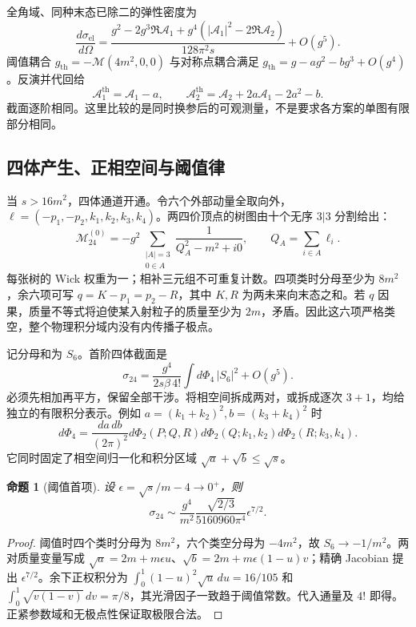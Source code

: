 \documentclass[11pt,a4paper,oneside]{ctexart}
\theoremstyle{cnplain}
\newtheorem{proposition}[theorem]{命题}
\theoremstyle{definition}
\theoremstyle{remark}
\numberwithin{equation}{section}
\begin{document}
全角域、同种末态已除二的弹性密度为
\begin{equation}
 \frac{d\sigma_{\mathrm{el}}}{d\Omega}
 =\frac{g^2-2g^3\Re\mathcal A_1+
 g^4(|\mathcal A_1|^2-2\Re\mathcal A_2)}{128\pi^2s}+O(g^5).
\end{equation}
阈值耦合 $g_{\mathrm{th}}=-\mathcal M(4m^2,0,0)$ 与对称点耦合满足 $g_{\mathrm{th}}=g-ag^2-bg^3+O(g^4)$。反演并代回给
\begin{equation}
 \mathcal A_1^{\mathrm{th}}=\mathcal A_1-a,\qquad
 \mathcal A_2^{\mathrm{th}}=\mathcal A_2+2a\mathcal A_1-2a^2-b.
\end{equation}
截面逐阶相同。这里比较的是同时换参后的可观测量，不是要求各方案的单图有限部分相同。


\subsection{四体产生、正相空间与阈值律}
当 $s>16m^2$，四体通道开通。令六个外部动量全取向外，$\ell=(-p_1,-p_2,k_1,k_2,k_3,k_4)$。两四价顶点的树图由十个无序 $3|3$ 分割给出：
\begin{equation}
 \mathcal M_{24}^{(0)}=-g^2\sum_{\substack{|A|=3\\0\in A}}
 \frac1{Q_A^2-m^2+i0},\qquad Q_A=\sum_{i\in A}\ell_i.
\end{equation}
每张树的 Wick 权重为一；相补三元组不可重复计数。四项类时分母至少为 $8m^2$，余六项可写 $q=K-p_1=p_2-R$，其中 $K,R$ 为两未来向末态之和。若 $q$ 因果，质量不等式将迫使某入射粒子的质量至少为 $2m$，矛盾。因此这六项严格类空，整个物理积分域内没有内传播子极点。

记分母和为 $S_6$。首阶四体截面是
\begin{equation}
 \sigma_{24}=\frac{g^4}{2s\beta\,4!}\int d\Phi_4\,|S_6|^2+O(g^5).
\end{equation}
必须先相加再平方，保留全部干涉。将相空间拆成两对，或拆成逐次 $3+1$，均给独立的有限积分表示。例如 $a=(k_1+k_2)^2,b=(k_3+k_4)^2$ 时
\begin{equation}
 d\Phi_4=\frac{da\,db}{(2\pi)^2}
 d\Phi_2(P;Q,R)d\Phi_2(Q;k_1,k_2)d\Phi_2(R;k_3,k_4).
\end{equation}
它同时固定了相空间归一化和积分区域 $\sqrt a+\sqrt b\le\sqrt s$。

\begin{proposition}[阈值首项]
设 $\epsilon=\sqrt s/m-4\to0^+$，则
\begin{equation}
 \sigma_{24}\sim\frac{g^4}{m^2}
 \frac{\sqrt{2/3}}{5160960\pi^4}\epsilon^{7/2}.
\end{equation}
\end{proposition}
\begin{proof}
阈值时四个类时分母为 $8m^2$，六个类空分母为 $-4m^2$，故 $S_6\to-1/m^2$。两对质量变量写成 $\sqrt a=2m+m\epsilon u$、$\sqrt b=2m+m\epsilon(1-u)v$；精确 Jacobian 提出 $\epsilon^{7/2}$。余下正权积分为 $\int_0^1(1-u)^2\sqrt u\,du=16/105$ 和 $\int_0^1\sqrt{v(1-v)}\,dv=\pi/8$，其光滑因子一致趋于阈值常数。代入通量及 $4!$ 即得。正紧参数域和无极点性保证取极限合法。
\end{proof}
\end{document}
